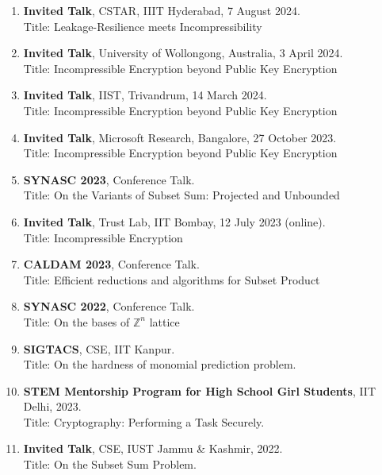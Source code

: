 \documentclass[margin]{res} %
\begin{document}
\begin{resume}
\begin{enumerate}
    \item \textbf{Invited Talk}, CSTAR, IIIT Hyderabad, 7 August 2024.\\
    Title: Leakage-Resilience meets Incompressibility
    
    \item \textbf{Invited Talk}, University of Wollongong, Australia, 3 April 2024.\\
    Title: Incompressible Encryption beyond Public Key Encryption
    
    \item \textbf{Invited Talk}, IIST, Trivandrum, 14 March 2024.\\
    Title: Incompressible Encryption beyond Public Key Encryption
    
    \item \textbf{Invited Talk}, Microsoft Research, Bangalore, 27 October 2023.\\
    Title: Incompressible Encryption beyond Public Key Encryption
    
    \item \textbf{SYNASC 2023}, Conference Talk.\\
    Title: On the Variants of Subset Sum: Projected and Unbounded
    
    \item \textbf{Invited Talk}, Trust Lab, IIT Bombay, 12 July 2023 (online).\\
    Title: Incompressible Encryption
    
    \item \textbf{CALDAM 2023}, Conference Talk.\\
    Title: Efficient reductions and algorithms for Subset Product

    \item \textbf{SYNASC 2022}, Conference Talk.\\
    Title: On the bases of $\mathbb{Z}^n$ lattice
    
    \item \textbf{SIGTACS}, CSE, IIT Kanpur.\\
    Title: On the hardness of monomial prediction problem.
    
    \item \textbf{STEM Mentorship Program for High School Girl Students}, IIT Delhi, 2023.\\
    Title: Cryptography: Performing a Task Securely.

    \item \textbf{Invited Talk}, CSE, IUST Jammu \& Kashmir, 2022.\\
    Title: On the Subset Sum Problem.
    

\end{enumerate}
\end{resume}
\end{document}
